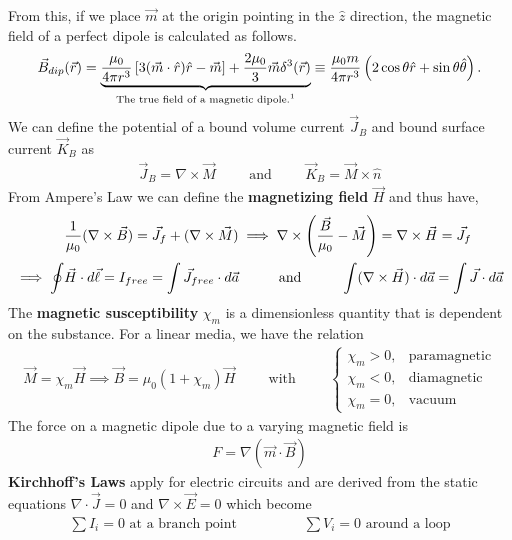 From this, if we place $\vec{m}$ at the origin pointing in the $\hat{z}$ direction, the magnetic field of a perfect dipole is calculated as follows. 
\begin{align}
	\vec{B}_{dip}(\vec{r}) = \underbrace{\frac{\mu_0}{4\pi r^3}\left[3(\vec{m}\cdot \hat{r})\hat{r}-\vec{m}\right]+\frac{2\mu_0}{3}\vec{m}\delta^3(\vec{r})}_{\textrm{The true field of a magnetic dipole.\footnotemark}} \equiv \frac{\mu_0 m}{4\pi r^3}\left(2\cos\theta\hat{r}+\sin\theta\hat{\theta}\right).
\end{align}
We can define the potential of a bound volume current $\vec{J}_B$ and bound surface current $\vec{K}_B$ as
\begin{align}
	\vec{J}_B = \nabla \times \vec{M} \hspace{1cm}\textrm{and}\hspace{1cm}\vec{K}_B = \vec{M}\times \hat{n}
\end{align}
From Ampere's Law we can define the \textbf{magnetizing field} $\vec{H}$ and thus have,
\begin{align}
	&\frac{1}{\mu_0}(\nabla \times \vec{B}) = \vec{J}_{f}+(\nabla \times \vec{M}) \implies \nabla \times \left(\frac{\vec{B}}{\mu_0}-\vec{M}\right) = \nabla \times \vec{H}=\vec{J}_f \\ \implies \oint &\vec{H}\cdot d\vec{\ell} = I_{free} = \int \vec{J}_{free}\cdot d\vec{a}  \andspace{1cm}
	\int (\nabla \times \vec{H})\cdot d\vec{a} = \int \vec{J}\cdot d\vec{a}
\end{align}
The \textbf{magnetic susceptibility} $\chi_m$ is a dimensionless quantity that is dependent on the substance. For a linear media, we have the relation
\begin{align}
	\vec{M} = \chi_m \vec{H} \implies \vec{B} = \mu_0(1+\chi_m)\vec{H}\hspace{1cm}\textrm{with}\hspace{1cm}
	\begin{cases}
		\chi_m > 0, & \textrm{paramagnetic} \\
		\chi_m < 0, & \textrm{diamagnetic} \\
		\chi_m = 0, & \textrm{vacuum}
	\end{cases}
\end{align}
The force on a magnetic dipole due to a varying magnetic field is
\begin{align}
	F=\nabla (\vec{m}\cdot \vec{B})
\end{align}
\textbf{Kirchhoff's Laws} apply for electric circuits and are derived from the static equations $\nabla \cdot \vec{J}=0$ and $\nabla \times \vec{E}=0$ which become
\begin{align}
	\sum I_i = 0 \textrm{ at a branch point}\hspace{2cm}\sum V_i = 0 \textrm{ around a loop}
\end{align}